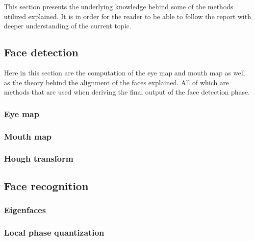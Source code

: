 This section presents the underlying knowledge behind some of the methods utilized explained. It is in order for the reader to be able to follow the report with deeper understanding of the current topic.

\subsection{Face detection}

Here in this section are the computation of the eye map and mouth map as well as the theory behind the alignment of the faces explained. All of which are methods that are used when deriving the final output of the face detection phase.

\subsubsection{Eye map}
\label{sub:FaceDetection}


\subsubsection{Mouth map}


\subsubsection{Hough transform}


\subsection{Face recognition}
\label{sub:FaceRecognition}


\subsubsection{Eigenfaces}
\label{subs:Eigenfaces}


\subsubsection{Local phase quantization}
\label{subs:LocalPhaseQuantization}

